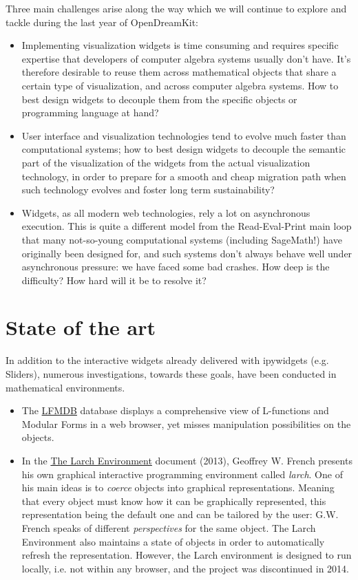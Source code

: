 \documentclass{deliverablereport}
\begin{document}
Three main challenges arise along the way which we will continue to
explore and tackle during the last year of OpenDreamKit:
\begin{itemize}
\item Implementing visualization widgets is time consuming and
  requires specific expertise that developers of computer algebra
  systems usually don't have. It's therefore desirable to reuse them
  across mathematical objects that share a certain type of
  visualization, and across computer algebra systems. How to best
  design widgets to decouple them from the specific objects or
  programming language at hand?
\item User interface and visualization technologies tend to evolve
  much faster than computational systems; how to best design widgets
  to decouple the semantic part of the visualization of the widgets
  from the actual visualization technology, in order to prepare for a
  smooth and cheap migration path when such technology evolves and
  foster long term sustainability?
\item Widgets, as all modern web technologies, rely a lot on
  asynchronous execution. This is quite a different model from the
  Read-Eval-Print main loop that many not-so-young computational
  systems (including SageMath!) have originally been designed for, and
  such systems don't always behave well under asynchronous pressure:
  we have faced some bad crashes. How deep is the difficulty? How hard
  will it be to resolve it?
\end{itemize}

\section{State of the art}


In addition to the interactive widgets already delivered with ipywidgets (e.g. Sliders), numerous investigations, towards these goals, have been conducted in mathematical environments.

\begin{itemize}
\item The \href{http://www.lmfdb.org/}{LFMDB} database displays a comprehensive view of L-functions and Modular Forms in a web browser, yet misses manipulation possibilities on the objects.
\item In the \href{https://core.ac.uk/download/pdf/9839511.pdf}{The
  Larch Environment} document (2013), Geoffrey W. French presents his own graphical
  interactive programming environment called \emph{larch}.
  One of his main ideas is to
  \emph{coerce} objects into graphical representations. Meaning that
  every object must know how it can be graphically represented, this
  representation being the default one and can be tailored by the
  user: G.W. French speaks of different \emph{perspectives} for the
  same object. The Larch Environment also maintains a state of objects
  in order to automatically refresh the representation.
  However, the Larch environment is designed to run locally, i.e. not
  within any browser, and the project was discontinued in 2014.
\end{itemize}
\end{document}
